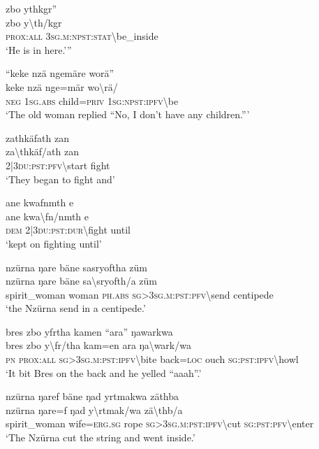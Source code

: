 \ea\label{ex:8:a1785}
zbo ythkgr''\\
\gll zbo	y{\textbackslash}th/kgr\\
     \textsc{prox}:\textsc{all}	3\textsc{sg}.\textsc{m}:\textsc{npst}:\textsc{stat}{\textbackslash}be\_inside\\
\glt `He is in here.'''
\z

\ea\label{ex:8:a1786}
``keke nzä ngemäre worä''\\
\gll keke	nzä	nge=mär	wo{\textbackslash}rä/\\
     \textsc{neg}	1\textsc{sg}.\textsc{abs}	child=\textsc{priv}	1\textsc{sg}:\textsc{npst}:\textsc{ipfv}{\textbackslash}be\\
\glt `The old woman replied ``No, I don't have any children.'''
\z

\ea\label{ex:8:a1787}
zathkäfath zan\\
\gll za{\textbackslash}thkäf/ath	zan\\
     2|3\textsc{du}:\textsc{pst}:\textsc{pfv}{\textbackslash}start	fight\\
\glt `They began to fight and'
\z

\ea\label{ex:8:a1788}
ane kwafnmth e\\
\gll ane	kwa{\textbackslash}fn/nmth	e\\
     \textsc{dem}	2|3\textsc{du}:\textsc{pst}:\textsc{dur}{\textbackslash}fight	until\\
\glt `kept on fighting until'
\z

\ea\label{ex:8:a1789}
nzürna ŋare bäne sasryoftha züm\\
\gll nzürna	ŋare	bäne	sa{\textbackslash}sryofth/a	züm\\
     spirit\_woman	woman	\textsc{ph}.\textsc{abs}	\textsc{sg}>3\textsc{sg}.\textsc{m}:\textsc{pst}:\textsc{pfv}{\textbackslash}send	centipede\\
\glt `the Nzürna send in a centipede.'
\z

\ea\label{ex:8:a1790}
bres zbo yfrtha kamen ``ara'' ŋawarkwa\\
\gll bres	zbo	y{\textbackslash}fr/tha	kam=en	ara	ŋa{\textbackslash}wark/wa\\
     \textsc{pn}	\textsc{prox}:\textsc{all}	\textsc{sg}>3\textsc{sg}.\textsc{m}:\textsc{pst}:\textsc{ipfv}{\textbackslash}bite	back=\textsc{loc}	ouch	\textsc{sg}:\textsc{pst}:\textsc{ipfv}{\textbackslash}howl\\
\glt `It bit Bres on the back and he yelled ``aaah''.'
\z

\ea\label{ex:8:a1793}
nzürna ŋaref bäne ŋad yrtmakwa zäthba\\
\gll nzürna	ŋare=f	ŋad	y{\textbackslash}rtmak/wa	zä{\textbackslash}thb/a\\
     spirit\_woman	wife=\textsc{erg}.\textsc{sg}	rope	\textsc{sg}>3\textsc{sg}.\textsc{m}:\textsc{pst}:\textsc{ipfv}{\textbackslash}cut	\textsc{sg}:\textsc{pst}:\textsc{pfv}{\textbackslash}enter\\
\glt `The Nzürna cut the string and went inside.'
\z


